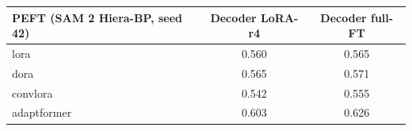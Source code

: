 \begin{tabular}{lcc}
\toprule
PEFT (SAM 2 Hiera-BP, seed 42) & Decoder LoRA-r4 & Decoder full-FT \\
\midrule
lora & 0.560 & 0.565 \\
dora & 0.565 & 0.571 \\
convlora & 0.542 & 0.555 \\
adaptformer & 0.603 & 0.626 \\
\bottomrule
\end{tabular}
